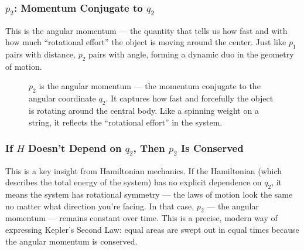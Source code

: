 \subsubsection{\( p_2 \): Momentum Conjugate to \( q_2 \)} 
    This is the angular momentum — the quantity that tells us how fast and with how much “rotational effort” the object is moving around the center. Just like \( p_1 \) pairs with distance, \( p_2 \) pairs with angle, forming a dynamic duo in the geometry of motion.


\begin{figure}[H]
\centering
{}
\caption{\( p_2 \) is the angular momentum — the momentum conjugate to the angular coordinate \( q_2 \). It captures how fast and forcefully the object is rotating around the central body. Like a spinning weight on a string, it reflects the “rotational effort” in the system.}
\end{figure}


\subsubsection{If \( H \) Doesn’t Depend on \( q_2 \), Then \( p_2 \) Is Conserved} 
    This is a key insight from Hamiltonian mechanics. If the Hamiltonian (which describes the total energy of the system) has no explicit dependence on \( q_2 \), it means the system has rotational symmetry — the laws of motion look the same no matter what direction you’re facing. In that case, \( p_2 \) — the angular momentum — remains constant over time. This is a precise, modern way of expressing Kepler’s Second Law: equal areas are swept out in equal times because the angular momentum is conserved.


